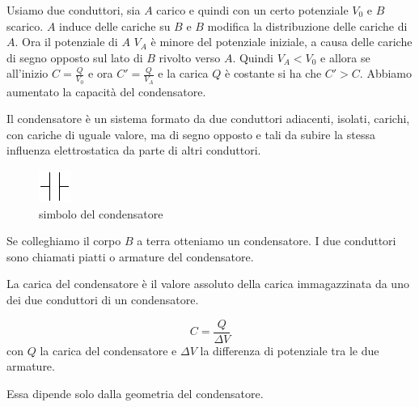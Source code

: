 Usiamo due conduttori, sia $A$ carico e quindi con un certo potenziale $V_0$ e $B$ scarico. $A$ induce delle cariche su $B$ e $B$ modifica la distribuzione delle cariche di $A$. Ora il potenziale di $A$ $V_A$ è minore del potenziale iniziale, a causa delle cariche di segno opposto sul lato di $B$ rivolto verso $A$. Quindi $V_A<V_0$ e allora se all'inizio $C=\frac{Q}{V_0}$ e ora $C'=\frac{Q}{V_A}$ e la carica $Q$ è costante si ha che $C'>C$. Abbiamo aumentato la capacità del condensatore.
\begin{Def}[condensatore]
Il condensatore è un sistema formato da due conduttori adiacenti, isolati, carichi, con cariche di uguale valore, ma di segno opposto e tali da subire la stessa influenza elettrostatica da parte di altri conduttori.
\end{Def}
\begin{figure}[htbp]
\centering
\includegraphics[scale=1.5]{immagini/fisica2/cond1}
\caption{simbolo del condensatore}
\end{figure}
Se colleghiamo il corpo $B$ a terra otteniamo un condensatore. I due conduttori sono chiamati piatti o armature del condensatore.
\begin{Def}
La carica del condensatore è il valore assoluto della carica immagazzinata da uno dei due conduttori di un condensatore.
\end{Def}
\begin{Def}
\[C=\frac{Q}{\Delta V}\]
con $Q$ la carica del condensatore e $\Delta V$ la differenza di potenziale tra le due armature.
\end{Def}
Essa dipende solo dalla geometria del condensatore.
